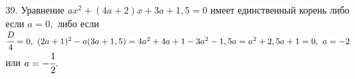 39. Уравнение $ax^2+(4a+2)x+3a+1,5=0$ имеет единственный корень либо если $a=0,$ либо если $\cfrac{D}{4}=0,\ (2a+1)^2-a(3a+1,5)=4a^2+4a+1-3a^2-1,5a=a^2+2,5a+1=0,\
a=-2$ или $a=-\cfrac{1}{2}.$\\
